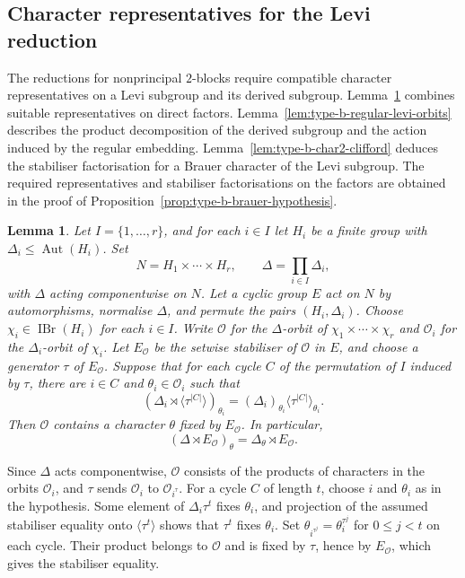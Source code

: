 \documentclass[10pt]{amsart}
\newtheorem{lemma}[theorem]{Lemma}
\theoremstyle{definition}
\renewcommand{\leq}{\leqslant}
\let\oldendproof\endproof
\renewenvironment{proof}[1][\proofname]{%
  \oldproof[\bfseries #1]%
}{\oldendproof}
\DeclareMathOperator{\Aut}{Aut}
\DeclareMathOperator{\IBr}{IBr}
\numberwithin{equation}{section}
\numberwithin{table}{section}
\begin{document}
\subsection{Character representatives for the Levi reduction}
\label{subsec:type-b-two-jordan}

The reductions for nonprincipal $2$-blocks require compatible character
representatives on a Levi subgroup and its derived subgroup.
Lemma~\ref{lem:type-b-component-return} combines suitable representatives
on direct factors. Lemma~\ref{lem:type-b-regular-levi-orbits} describes
the product decomposition of the derived subgroup and the action induced
by the regular embedding.
Lemma~\ref{lem:type-b-char2-clifford} deduces the stabiliser
factorisation for a Brauer character of the Levi subgroup.
The required representatives and stabiliser factorisations on the
factors are obtained in the proof of
Proposition~\ref{prop:type-b-brauer-hypothesis}.

\begin{lemma}\label{lem:type-b-component-return}
Let $I=\{1,\ldots,r\}$, and for each $i\in I$ let $H_i$ be a finite group with
$\Delta_i\leq\Aut(H_i)$.  Set
\[
 N=H_1\times\cdots\times H_r,\qquad
 \Delta=\prod_{i\in I}\Delta_i,
\]
with $\Delta$ acting componentwise on $N$.  Let a cyclic group $E$ act
on $N$ by automorphisms, normalise $\Delta$, and permute the pairs
$(H_i,\Delta_i)$.
Choose $\chi_i\in\IBr(H_i)$ for each $i\in I$. Write $\mathcal O$ for the
$\Delta$-orbit of $\chi_1\times\cdots\times\chi_r$ and $\mathcal O_i$ for the
$\Delta_i$-orbit of $\chi_i$.
Let $E_{\mathcal O}$ be the setwise stabiliser of $\mathcal O$ in $E$,
and choose a generator $\tau$ of $E_{\mathcal O}$.
Suppose that for each cycle $C$ of the permutation of $I$ induced by
$\tau$, there are $i\in C$ and $\theta_i\in\mathcal O_i$ such that
\[
 (\Delta_i\rtimes\langle\tau^{|C|}\rangle)_{\theta_i}
   =(\Delta_i)_{\theta_i}\langle\tau^{|C|}\rangle_{\theta_i}.
\]
Then $\mathcal O$ contains a character $\theta$ fixed by
$E_{\mathcal O}$.  In particular,
\[
 (\Delta\rtimes E_{\mathcal O})_\theta
   =\Delta_\theta\rtimes E_{\mathcal O}.
\]
\end{lemma}

\begin{proof}
Since $\Delta$ acts componentwise, $\mathcal O$ consists of the products
of characters in the orbits $\mathcal O_i$, and $\tau$ sends
$\mathcal O_i$ to $\mathcal O_{i^\tau}$. For a cycle $C$ of length $t$,
choose $i$ and $\theta_i$ as in the hypothesis. Some element of
$\Delta_i\tau^t$ fixes $\theta_i$, and projection of the assumed
stabiliser equality onto $\langle\tau^t\rangle$ shows that $\tau^t$
fixes $\theta_i$. Set $\theta_{i^{\tau^j}}=\theta_i^{\tau^j}$ for
$0\leq j<t$ on each cycle. Their product belongs to $\mathcal O$ and is
fixed by $\tau$, hence by $E_{\mathcal O}$, which gives the stabiliser
equality.
\end{proof}
\end{document}
